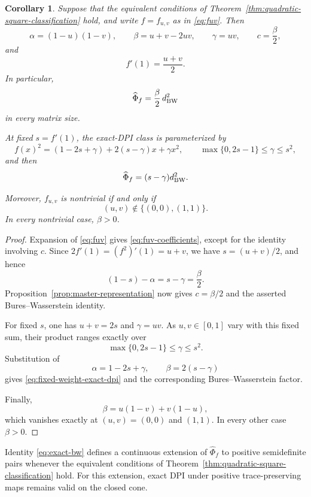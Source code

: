 \documentclass[11pt]{amsart}
\newtheorem{corollary}[theorem]{Corollary}
\theoremstyle{definition}
\theoremstyle{remark}
\newcommand{\altPhi}{\widehat{\Phi}}
\begin{document}
\begin{corollary}
	\label{cor:exact-dpi-parameters}
	Suppose that the equivalent conditions of
	Theorem~\ref{thm:quadratic-square-classification} hold, and write
	$f=f_{u,v}$ as in \eqref{eq:fuv}.  Then
	\begin{equation}\label{eq:fuv-coefficients}
		\alpha=(1-u)(1-v),
		\qquad
		\beta=u+v-2uv,
		\qquad
		\gamma=uv,
		\qquad
		c=\frac{\beta}{2},
	\end{equation}
	and
	\[
	f'(1)=\frac{u+v}{2}.
	\]
	In particular,
	\[
	\altPhi_f=\frac{\beta}{2}\,d_{\rm BW}^2
	\]
	in every matrix size.
	
	At fixed $s=f'(1)$, the exact-DPI class is parameterized by
	\begin{equation}\label{eq:fixed-weight-exact-dpi}
		f(x)^2
		=(1-2s+\gamma)+2(s-\gamma)x+\gamma x^2,
		\qquad
		\max\{0,2s-1\}\le\gamma\le s^2,
	\end{equation}
	and then
	\[
	\altPhi_f=(s-\gamma)d_{\rm BW}^2.
	\]
	
	Moreover, $f_{u,v}$ is nontrivial if and only if
	\[
	(u,v)\notin\{(0,0),(1,1)\}.
	\]
	In every nontrivial case, $\beta>0$.
\end{corollary}

\begin{proof}
	Expansion of \eqref{eq:fuv} gives
	\eqref{eq:fuv-coefficients}, except for the identity involving $c$.
	Since $2f'(1)=(f^2)'(1)=u+v$, we have
	$s=(u+v)/2$, and hence
	\[
	(1-s)-\alpha=s-\gamma=\frac{\beta}{2}.
	\]
	Proposition~\ref{prop:master-representation} now gives
	$c=\beta/2$ and the asserted Bures--Wasserstein identity.
	
	For fixed $s$, one has $u+v=2s$ and $\gamma=uv$.  As
	$u,v\in[0,1]$ vary with this fixed sum, their product ranges exactly
	over
	\[
	\max\{0,2s-1\}\le\gamma\le s^2.
	\]
	Substitution of
	\[
	\alpha=1-2s+\gamma,
	\qquad
	\beta=2(s-\gamma)
	\]
	gives \eqref{eq:fixed-weight-exact-dpi} and the corresponding
	Bures--Wasserstein factor.
	
	Finally,
	\[
	\beta=u(1-v)+v(1-u),
	\]
	which vanishes exactly at $(u,v)=(0,0)$ and $(1,1)$.  In every
	other case $\beta>0$.
\end{proof}

Identity \eqref{eq:exact-bw} defines a continuous extension of
$\altPhi_f$ to positive semidefinite pairs whenever the equivalent
conditions of Theorem~\ref{thm:quadratic-square-classification} hold.
For this extension, exact DPI under positive trace-preserving maps remains
valid on the closed cone.
\end{document}
